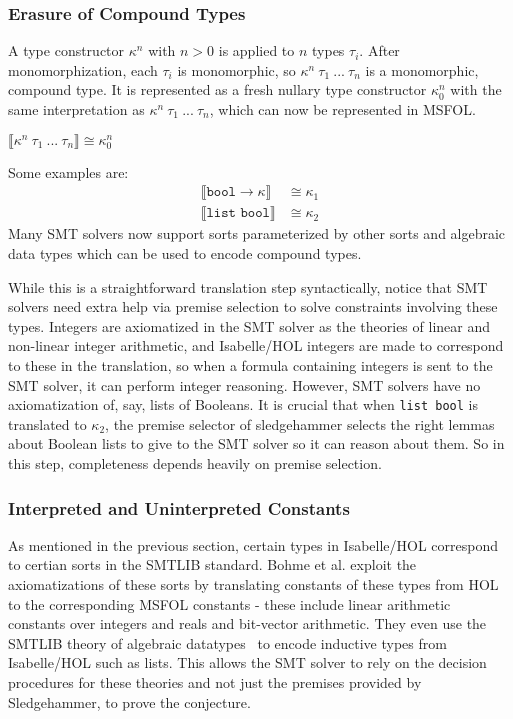 \documentclass{article}
\begin{document}
	\subsubsection{Erasure of Compound Types}
		A type constructor $\kappa^n$ with 
		$n > 0$ is applied to $n$ types 
		$\tau_i$. After monomorphization, 
		each $\tau_i$ is monomorphic, so 
		$\kappa^n\ \tau_1\ ...\ \tau_n$ 
		is a monomorphic, compound type. It
		is represented as a fresh nullary 
		type constructor $\kappa_0^n$ with 
		the same interpretation as 
		$\kappa^n\ \tau_1\ ...\ \tau_n$, 
		which can now be represented in 
		MSFOL.
		\begin{center}
			$\llbracket \kappa^n\ 
			\tau_1\ ...\ \tau_n \rrbracket
			\cong \kappa_0^n$
		\end{center}
		Some examples are:
		\begin{align*}
			\llbracket \texttt{bool} \to
			\kappa \rrbracket &\cong \kappa_1\\
			\llbracket \texttt{list\ bool}
			\rrbracket &\cong \kappa_2
		\end{align*}
		Many SMT solvers now support sorts 
		parameterized by other sorts and 
		algebraic data types which can be 
		used to encode compound types.
		
		While this is a straightforward
		translation step syntactically, 
		notice that SMT solvers need 
		extra help via premise selection 
		to solve constraints involving 
		these types. Integers are 
		axiomatized in the SMT solver as 
		the theories of linear and 
		non-linear integer arithmetic, and 
		Isabelle/HOL integers are made to 
		correspond to these in the translation, 
		so when a formula containing 
		integers is sent to the SMT solver, 
		it can perform integer reasoning. 
		However, SMT solvers have no 
		axiomatization of, say, lists 
		of Booleans. It is crucial that when 
		\texttt{list bool} is 
		translated to $\kappa_2$, the 
		premise selector of sledgehammer
		selects the right lemmas about 
		Boolean lists to give to the 
		SMT solver so it can reason 
		about them. So in this step, 
		completeness depends heavily on 
		premise selection.
		
	\subsubsection{Interpreted and Uninterpreted Constants}
		As mentioned in the previous section,
		certain types in Isabelle/HOL correspond
		to certian sorts in the SMTLIB standard.
		Bohme et al. exploit the axiomatizations 
		of these sorts by translating constants 
		of these types from HOL to the 
		corresponding MSFOL constants - these 
		include linear arithmetic constants over 
		integers and reals and bit-vector 
		arithmetic. They even use the SMTLIB 
		theory of algebraic 
		datatypes~\cite{BarST-PDPAR-06} to 
		encode inductive types from Isabelle/HOL
		such as lists. This allows the SMT solver
		to rely on the decision procedures for 
		these theories and not just the premises
		provided by Sledgehammer, to prove the 
		conjecture. 
		
\end{document}
